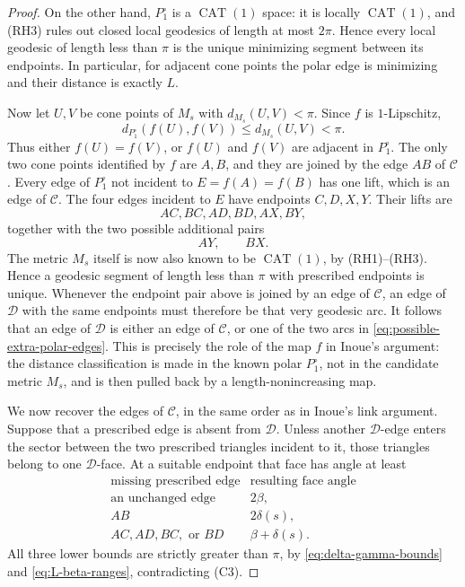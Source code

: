 \documentclass[12pt,a4paper]{article}
\theoremstyle{definition}
\begin{document}
\begin{proof}
On the other hand, \(P_1^\circ\) is a
\(\operatorname{CAT}(1)\) space: it is locally \(\operatorname{CAT}(1)\), and
\textup{(RH3)} rules out closed local geodesics of
length at most \(2\pi\). Hence every local geodesic of length less than
\(\pi\) is the unique minimizing segment between its endpoints. In
particular, for adjacent cone points the polar edge is minimizing and their
distance is exactly \(L\).

Now let \(U,V\) be cone points of \(M_s\) with
\(d_{M_s}(U,V)<\pi\). Since \(f\) is \(1\)-Lipschitz,
\[
 d_{P_1^\circ}(f(U),f(V))
 \le d_{M_s}(U,V)<\pi.
\]
Thus either \(f(U)=f(V)\), or \(f(U)\) and \(f(V)\) are adjacent in
\(P_1^\circ\). The only two cone points identified by \(f\) are \(A,B\), and
they are joined by the edge \(AB\) of \(\mathcal C\). Every edge of
\(P_1^\circ\) not incident to \(E=f(A)=f(B)\) has one lift, which is an edge
of \(\mathcal C\). The four edges incident to \(E\) have endpoints
\(C,D,X,Y\). Their lifts are
\[
 AC,BC,AD,BD,AX,BY,
\]
together with the two possible additional pairs
\begin{equation}\label{eq:possible-extra-polar-edges}
        AY,\qquad BX.
\end{equation}
The metric \(M_s\) itself is now also known to be
\(\operatorname{CAT}(1)\), by \textup{(RH1)}--\textup{(RH3)}. Hence a
geodesic segment of length less than \(\pi\) with prescribed endpoints is
unique. Whenever the endpoint pair above is joined by an edge of
\(\mathcal C\), an edge of \(\mathcal D\) with the same endpoints must
therefore be that very geodesic arc.
It follows that an edge of \(\mathcal D\) is either an edge of
\(\mathcal C\), or one of the two arcs in
\eqref{eq:possible-extra-polar-edges}. This is precisely the role of the map
\(f\) in Inoue's argument: the distance classification is made in the known
polar \(P_1^\circ\), not in the candidate metric \(M_s\), and is then pulled
back by a length-nonincreasing map.

We now recover the edges of \(\mathcal C\), in the same order as in Inoue's
link argument. Suppose that a prescribed edge is absent from \(\mathcal D\).
Unless another \(\mathcal D\)-edge enters the sector between the two
prescribed triangles incident to it, those triangles belong to one
\(\mathcal D\)-face. At a suitable endpoint that face has angle at least
\[
\begin{array}{c|c}
\text{missing prescribed edge}&\text{resulting face angle}\\
\hline
\text{an unchanged edge}&2\beta,\\
AB&2\delta(s),\\
AC,AD,BC,\text{ or }BD&\beta+\delta(s).
\end{array}
\]
All three lower bounds are strictly greater than \(\pi\), by
\eqref{eq:delta-gamma-bounds} and \eqref{eq:L-beta-ranges}, contradicting
\textup{(C3)}.


\end{proof}
\end{document}
